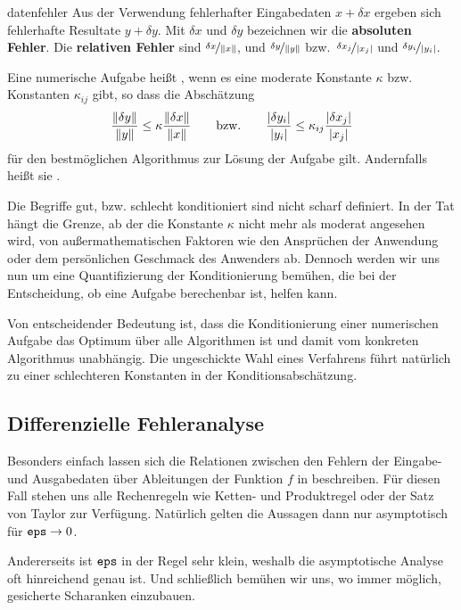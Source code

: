 \begin{Definition}{datenfehler}
  Aus der Verwendung fehlerhafter Eingabedaten $x+\delta x$ ergeben
  sich fehlerhafte Resultate $y+\delta y$. Mit $\delta x$ und
  $\delta y$ bezeichnen wir die \textbf{absoluten
    Fehler}. Die
  \textbf{relativen Fehler} sind
  $\nicefrac{\delta x}{\lVert x\rVert}$, und $\nicefrac{\delta y}{\lVert y\rVert}$ bzw.\
  $\nicefrac{\delta x_j}{\lvert x_j\rvert}$ und $\nicefrac{\delta y_i}{\lvert y_i\rvert}$.

  Eine numerische Aufgabe heißt , wenn es
  eine moderate Konstante $\kappa$ bzw. Konstanten $\kappa_{ij}$ gibt, so dass die Abschätzung
  \begin{gather}
    \frac{\lVert\delta y\rVert}{\lVert y\rVert}
    \le \kappa \frac{\lVert\delta x\rVert}{\lVert x\rVert}
    \qquad\text{bzw.}\qquad
    \frac{\lvert\delta y_i\rvert}{\lvert y_i\rvert}
    \le \kappa_{ij} \frac{\lvert\delta x_j\rvert}{\lvert x_j\rvert}
  \end{gather}
  für den bestmöglichen Algorithmus zur Lösung der Aufgabe
  gilt. Andernfalls heißt sie .
\end{Definition}

\begin{remark}
  Die Begriffe \glqq gut\grqq, bzw. \glqq schlecht
  konditioniert\grqq{} sind nicht scharf definiert. In der Tat hängt
  die Grenze, ab der die Konstante $\kappa$ nicht mehr als \glqq
  moderat\grqq{} angesehen wird, von außermathematischen Faktoren wie
  den Ansprüchen der Anwendung oder dem persönlichen Geschmack des
  Anwenders ab. Dennoch werden wir uns nun um eine Quantifizierung der
  Konditionierung bemühen, die bei der Entscheidung, ob eine Aufgabe
  berechenbar ist, helfen kann.
\end{remark}

\begin{remark}
  Von entscheidender Bedeutung ist, dass die Konditionierung einer
  numerischen Aufgabe das Optimum über alle Algorithmen ist und damit
  vom konkreten Algorithmus unabhängig. Die ungeschickte Wahl eines
  Verfahrens führt natürlich zu einer schlechteren Konstanten in der
  Konditionsabschätzung.
\end{remark}

\subsection{Differenzielle Fehleranalyse}

\begin{intro}
  Besonders einfach lassen sich die Relationen zwischen den Fehlern
  der Eingabe- und Ausgabedaten über Ableitungen der Funktion $f$ in
  \slideref{Definition}{aufgabe} beschreiben. Für diesen Fall stehen
  uns alle Rechenregeln wie Ketten- und Produktregel oder der Satz von
  Taylor zur Verfügung. Natürlich gelten die Aussagen dann nur
  asymptotisch für $\texttt{eps} \to 0$.

  Andererseits ist $\texttt{eps}$ in der Regel sehr klein, weshalb die
  asymptotische Analyse oft hinreichend genau ist. Und schließlich
  bemühen wir uns, wo immer möglich, gesicherte Scharanken einzubauen.
\end{intro}

